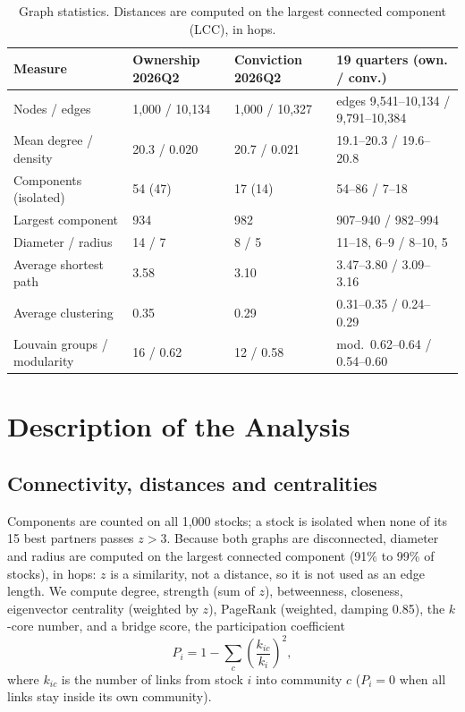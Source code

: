 \documentclass[10pt,a4paper]{article}
\begin{document}
\begin{table}[H]
\centering\footnotesize\setlength{\tabcolsep}{3pt}
\caption{Graph statistics. Distances are computed on the largest connected component (LCC), in hops.}
\label{tab:graph}
\begin{tabularx}{\linewidth}{@{}p{2.8cm}p{2.05cm}p{2.05cm}Y@{}}
\toprule
Measure & Ownership 2026Q2 & Conviction 2026Q2 & 19 quarters (own. / conv.) \\
\midrule
Nodes / edges & 1,000 / 10,134 & 1,000 / 10,327 & edges 9,541--10,134 / 9,791--10,384 \\
Mean degree / density & 20.3 / 0.020 & 20.7 / 0.021 & 19.1--20.3 / 19.6--20.8 \\
Components (isolated) & 54 (47) & 17 (14) & 54--86 / 7--18 \\
Largest component & 934 & 982 & 907--940 / 982--994 \\
Diameter / radius & 14 / 7 & 8 / 5 & 11--18, 6--9 / 8--10, 5 \\
Average shortest path & 3.58 & 3.10 & 3.47--3.80 / 3.09--3.16 \\
Average clustering & 0.35 & 0.29 & 0.31--0.35 / 0.24--0.29 \\
Louvain groups / modularity & 16 / 0.62 & 12 / 0.58 & mod.\ 0.62--0.64 / 0.54--0.60 \\
\bottomrule
\end{tabularx}
\end{table}

\section{Description of the Analysis}
\subsection{Connectivity, distances and centralities}
Components are counted on all 1,000 stocks; a stock is isolated when none of its 15 best partners passes $z>3$. Because both graphs are disconnected, diameter and radius are computed on the largest connected component (91\% to 99\% of stocks), in hops: $z$ is a similarity, not a distance, so it is not used as an edge length. We compute degree, strength (sum of $z$), betweenness, closeness, eigenvector centrality (weighted by $z$), PageRank (weighted, damping 0.85), the $k$-core number, and a bridge score, the participation coefficient
\begin{equation}
  P_i = 1 - \sum_{c} \left(\frac{k_{ic}}{k_i}\right)^{2},
\end{equation}
where $k_{ic}$ is the number of links from stock $i$ into community $c$ ($P_i=0$ when all links stay inside its own community).
\end{document}

